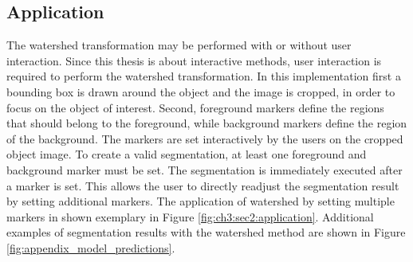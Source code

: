 \subsection{Application}\label{ord:ch3:sec2:subsec2}
The watershed transformation may be performed with or without user interaction.
Since this thesis is about interactive methods, user interaction is required to perform the watershed transformation.
In this implementation first a bounding box is drawn around the object and the image is cropped, in order to focus on the object of interest.
Second, foreground markers define the regions that should belong to the foreground, while background markers define the region of the background.
The markers are set interactively by the users on the cropped object image.
To create a valid segmentation, at least one foreground and background marker must be set.
The segmentation is immediately executed after a marker is set.
This allows the user to directly readjust the segmentation result by setting additional markers.
The application of watershed by setting multiple markers in shown exemplary in Figure \ref{fig:ch3:sec2:application}.
Additional examples of segmentation results with the watershed method are shown in Figure \ref{fig:appendix_model_predictions}.

